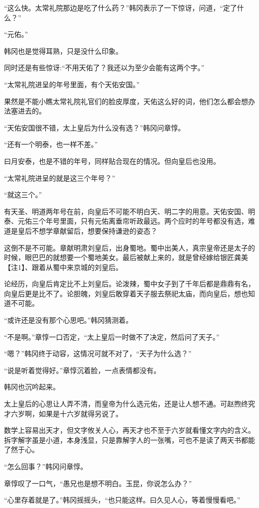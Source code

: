 “这么快。太常礼院那边是吃了什么药？”韩冈表示了一下惊讶，问道，“定了什么？”

“元佑。”

韩冈也是觉得耳熟，只是没什么印象。

同时还是有些惊讶:“不用天佑了？我还以为至少会能有这两个字。”

“太常礼院进呈的年号里面，有个天佑安国。”

果然是不能小瞧太常礼院礼官们的脸皮厚度，天佑这么好的词，他们怎么都会想办法塞进去的。

“天佑安国很不错，太上皇后为什么没有选？”韩冈问章惇。

“还有一个明泰，也一样不差。”

曰月安泰，也是不错的年号，同样贴合现在的情况。但向皇后也没用。

“太常礼院进呈的就是这三个年号？”

“就这三个。”

有天圣、明道两年号在前，向皇后不可能不明白天、明二字的用意。天佑安国、明泰、元佑三个年号里面，只有元佑离垂帘听政最远。两个应时的年号都没有选，难道是皇后不想学章献留后，想要保持谦逊的姿态？

这倒不是不可能。章献明肃刘皇后，出身蜀地。蜀中出美人，真宗皇帝还是太子的时候，眼巴巴的就想要一个蜀地美女。最后被献上来的，就是曾经嫁给银匠龚美【注1】、跟着从蜀中来京城的刘皇后。

论经历，向皇后肯定比不上刘皇后。论泼辣，蜀中女子到了千年后都是鼎鼎有名，向皇后更是比不了。论胆魄，刘皇后敢穿着天子服去祭祀太庙，而向皇后，想也知道不可能。

“或许还是没有那个心思吧。”韩冈猜测着。

“不是啊。”章惇一口否定，“太上皇后一时做不了决定，然后问了天子。”

“嗯？”韩冈终于动容，这情况可就不对了，“天子为什么选？”

“说是听着觉得好。”章惇沉着脸，一点表情都没有。

韩冈也沉吟起来。

太上皇后的心思让人弄不清，而皇帝为什么选元佑，还是让人想不通。可赵煦终究才六岁啊，如果是十六岁就得另说了。

数学上容易出天才，但文字攸关人心，再天才也不至于六岁就看懂文字内的含义。拆字解字虽是小道，本身浅显，只是靠解字人的一张嘴，可也不是读了两天书都能了然于心。

“怎么回事？”韩冈问章惇。

章惇叹了一口气，“愚兄也是想不明白。玉昆，你说怎么办？”

“心里存着就是了。”韩冈摇摇头，“也只能这样。曰久见人心，等着慢慢看吧。”

